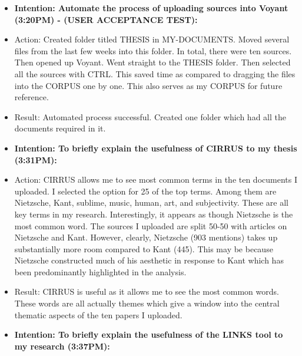 \documentclass[a4paper,12pt]{article}
\begin{document}
\begin{itemize}
\item \textbf{Intention: Automate the process of uploading sources into Voyant (3:20PM) - (USER ACCEPTANCE TEST):}


\item Action: Created folder titled THESIS in MY-DOCUMENTS. Moved several files from the last few weeks into this folder. In total, there were ten sources. Then opened up Voyant. Went straight to the THESIS folder. Then selected all the sources with CTRL. This saved time as compared to dragging the files into the CORPUS one by one. This also serves as my CORPUS for future reference.  


\item Result: Automated process successful. Created one folder which had all the documents required in it. 


\item \textbf{Intention: To briefly explain the usefulness of CIRRUS to my thesis (3:31PM):}


\item Action: CIRRUS allows me to see most common terms in the ten documents I uploaded. I selected the option for 25 of the top terms. Among them are Nietzsche, Kant, sublime, music, human, art, and subjectivity. These are all key terms in my research. Interestingly, it appears as though Nietzsche is the most common word. The sources I uploaded are split 50-50 with articles on Nietzsche and Kant. However, clearly, Nietzsche (903 mentions) takes up substantially more room compared to Kant (445). This may be because Nietzsche constructed much of his aesthetic in response to Kant which has been predominantly highlighted in the analysis. 


\item Result: CIRRUS is useful as it allows me to see the most common words. These words are all actually themes which give a window into the central thematic aspects of the ten papers I uploaded. 


\item \textbf{Intention: To briefly explain the usefulness of the LINKS tool to my research (3:37PM):}



\end{itemize}
\end{document}
